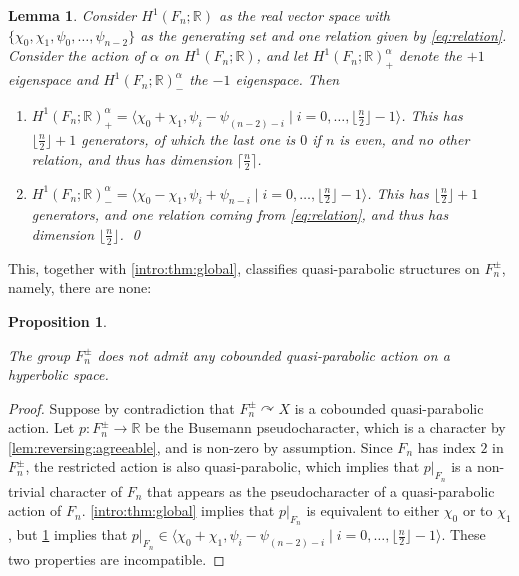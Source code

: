 \documentclass[reqno,12pt]{amsart}\setcounter{tocdepth}{1}
\newtheorem{lemma}[theorem]{Lemma}
\newtheorem{proposition}[theorem]{Proposition}
\theoremstyle{definition}
\newcommand{\R}{\mathbb{R}}
\numberwithin{equation}{section}
\begin{document}
\begin{lemma}
\label{lem:eigenspaces}
Consider $H^1(F_n; \R)$ as the real vector space with $\{ \chi_0, \chi_1, \psi_0, \ldots, \psi_{n-2} \}$ as the generating set and one relation given by \cref{eq:relation}. Consider the action of $\alpha$ on $H^1(F_n; \R)$, and let $H^1(F_n; \R)^{\alpha}_+$ denote the $+1$ eigenspace and $H^1(F_n; \R)^{\alpha}_-$ the $-1$ eigenspace. Then
\begin{enumerate}
\item $H^1(F_n; \R)^{\alpha}_+ = \langle \chi_0 + \chi_1, \psi_i - \psi_{(n-2)-i} \mid i = 0, \ldots, \lfloor \frac{n}{2} \rfloor-1 \rangle$. This has $\lfloor \frac{n}{2} \rfloor + 1$ generators, of which the last one is $0$ if $n$ is even, and no other relation, and thus has dimension $\lceil \frac{n}{2} \rceil$.
\item $H^1(F_n; \R)^{\alpha}_- = \langle \chi_0 - \chi_1, \psi_i + \psi_{n-i} \mid i = 0, \ldots, \lfloor \frac{n}{2} \rfloor-1 \rangle$. This has $\lfloor \frac{n}{2} \rfloor + 1$ generators, and one relation coming from \cref{eq:relation}, and thus has dimension $\lfloor \frac{n}{2} \rfloor$. \qed
\end{enumerate}
\end{lemma}

This, together with \cref{intro:thm:global}, classifies quasi-parabolic structures on $F_n^{\pm}$, namely, there are none:

\begin{proposition}
\label{prop:reversing:qp}

The group $F_n^{\pm}$ does not admit any cobounded quasi-parabolic action on a hyperbolic space.
\end{proposition}

\begin{proof}
Suppose by contradiction that $F_n^\pm \curvearrowright X$ is a cobounded quasi-parabolic action. Let $p \colon F_n^\pm \to \R$ be the Busemann pseudocharacter, which is a character by \cref{lem:reversing:agreeable}, and is non-zero by assumption. Since $F_n$ has index $2$ in $F_n^{\pm}$, the restricted action is also quasi-parabolic, which implies that $p|_{F_n}$ is a non-trivial character of $F_n$ that appears as the pseudocharacter of a quasi-parabolic action of $F_n$. \cref{intro:thm:global} implies that $p|_{F_n}$ is equivalent to either $\chi_0$ or to $\chi_1$, but \cref{lem:eigenspaces} implies that $p|_{F_n} \in \langle \chi_0 + \chi_1, \psi_i - \psi_{(n-2)-i} \mid i = 0, \ldots, \lfloor \frac{n}{2} \rfloor-1 \rangle$. These two properties are incompatible.
\end{proof}
\end{document}
